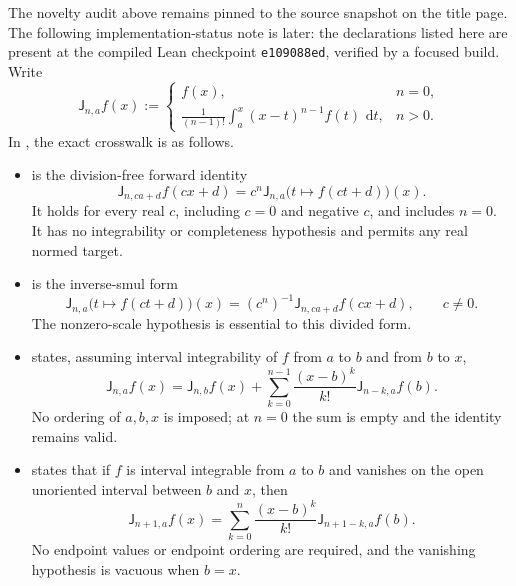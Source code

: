 \documentclass[11pt,oneside]{article}
\theoremstyle{definition}
\theoremstyle{remark}
\newcommand{\dd}{\,\mathrm d}
\newcommand{\1}{\mathbf 1}
\begin{document}
The novelty audit above remains pinned to the source snapshot on the title page.  The
following implementation-status note is later: the declarations listed here are present at
the compiled Lean checkpoint \texttt{e109088ed}, verified by a focused build.  Write
\begin{equation}
 \mathsf J_{n,a}f(x):=
 \begin{cases}
 f(x),&n=0,\\[1mm]
 \displaystyle\frac1{(n-1)!}\int_a^x(x-t)^{n-1}f(t)\,\dd t,&n>0.
 \end{cases}                                                \label{p3:eq:lean-volterra-crosswalk}
\end{equation}
In , the exact crosswalk is as follows.
\begin{itemize}
\item {} is the division-free forward identity
\begin{equation}
 \mathsf J_{n,ca+d}f(cx+d)
 =c^n\mathsf J_{n,a}\bigl(t\mapsto f(ct+d)\bigr)(x).          \label{p3:eq:lean-affine-forward}
\end{equation}
It holds for every real $c$, including $c=0$ and negative $c$, and includes $n=0$.
It has no integrability or completeness hypothesis and permits any real normed target.
\item {} is the inverse-smul form
\begin{equation}
 \mathsf J_{n,a}\bigl(t\mapsto f(ct+d)\bigr)(x)
 =(c^n)^{-1}\mathsf J_{n,ca+d}f(cx+d),\qquad c\ne0.           \label{p3:eq:lean-affine-inverse}
\end{equation}
The nonzero-scale hypothesis is essential to this divided form.
\item {} states, assuming interval integrability of
$f$ from $a$ to $b$ and from $b$ to $x$,
\begin{equation}
 \mathsf J_{n,a}f(x)=\mathsf J_{n,b}f(x)
 +\sum_{k=0}^{n-1}\frac{(x-b)^k}{k!}\mathsf J_{n-k,a}f(b).    \label{p3:eq:lean-basepoint-shift}
\end{equation}
No ordering of $a,b,x$ is imposed; at $n=0$ the sum is empty and the identity remains
valid.
\item {} states that if $f$ is interval
integrable from $a$ to $b$ and vanishes on the open unoriented interval between $b$
and $x$, then
\begin{equation}
 \mathsf J_{n+1,a}f(x)
 =\sum_{k=0}^{n}\frac{(x-b)^k}{k!}\mathsf J_{n+1-k,a}f(b).    \label{p3:eq:lean-zero-tail}
\end{equation}
No endpoint values or endpoint ordering are required, and the vanishing hypothesis is
vacuous when $b=x$.
\end{itemize}
\end{document}
